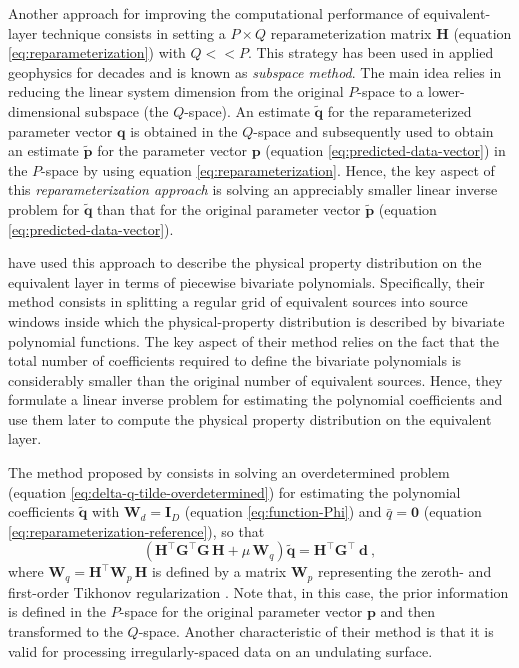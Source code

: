 \documentclass[utf8]{FrontiersinHarvard} %
\begin{document}
	Another approach for improving the computational performance of equivalent-layer technique consists in 
	setting a $P \times Q$ reparameterization matrix $\mathbf{H}$ (equation \ref{eq:reparameterization})
	with $Q << P$. 
	This strategy has been used in applied geophysics for decades \cite[e.g.,][]{skilling-bryan1984, kennett1988, oldenburg1993, barbosa-etal1997} 
	and is known as \textit{subspace method}. 
	The main idea relies in reducing the linear system dimension from the original $P$-space to a lower-dimensional subspace (the $Q$-space).
	An estimate $\tilde{\mathbf{q}}$ for the reparameterized parameter vector $\mathbf{q}$
	is obtained in the $Q$-space and subsequently used to obtain an estimate $\tilde{\mathbf{p}}$ 
	for the parameter vector $\mathbf{p}$ (equation \ref{eq:predicted-data-vector}) in the $P$-space by using equation
	\ref{eq:reparameterization}. 
	Hence, the key aspect of this \textit{reparameterization approach} is solving an appreciably smaller linear inverse problem for 
	$\tilde{\mathbf{q}}$ than that for the original parameter vector $\tilde{\mathbf{p}}$ (equation \ref{eq:predicted-data-vector}).
	
	\cite{oliveirajr-etal2013} have used this approach to describe the physical property distribution on the
	equivalent layer in terms of piecewise bivariate polynomials.
	Specifically, their method consists in splitting a regular grid of equivalent sources into 
	source windows inside which the physical-property distribution is described by bivariate polynomial 
	functions. The key aspect of their method relies on the fact that the total number of coefficients 
	required to define the bivariate polynomials is considerably smaller than the original number of equivalent sources. 
	Hence, they formulate a linear inverse problem for estimating the polynomial coefficients and use them later
	to compute the physical property distribution on the equivalent layer. 
	
	The method proposed by \cite{oliveirajr-etal2013} consists in solving an overdetermined problem 
	(equation \ref{eq:delta-q-tilde-overdetermined}) for estimating the polynomial coefficients 
	$\tilde{\mathbf{q}}$ with $\mathbf{W}_{d} = \mathbf{I}_{D}$ (equation \ref{eq:function-Phi}) and
	$\bar{q} = \mathbf{0}$ (equation \ref{eq:reparameterization-reference}), so that
	\begin{equation}
		\left( \mathbf{H}^{\top} \mathbf{G}^{\top} \mathbf{G} \, \mathbf{H} + 
		\mu \, \mathbf{W}_{q} \right) 
		\tilde{\mathbf{q}} = 
		\mathbf{H}^{\top} \mathbf{G}^{\top} \: \mathbf{d} \: ,
		\label{eq:q-tilde-OBU13}
	\end{equation}
	where $\mathbf{W}_{q} = \mathbf{H}^{\top}\mathbf{W}_{p} \, \mathbf{H}$ is defined by a matrix $\mathbf{W}_{p}$
	representing the zeroth- and first-order Tikhonov regularization \cite[e.g.,][p. 103]{aster_etal2019}.
	Note that, in this case, the prior information is defined in the $P$-space for the original parameter vector $\mathbf{p}$
	and then transformed to the $Q$-space.
	Another characteristic of their method is that it is valid for processing irregularly-spaced data
	on an undulating surface.
	
\end{document}
